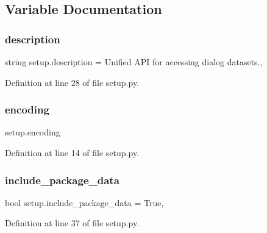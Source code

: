 \subsection{Variable Documentation}
\mbox{\label{namespacesetup_ade8aa54df2083113a10326ea2fe7934b}} 
\subsubsection{\texorpdfstring{description}{description}}
{\footnotesize\ttfamily string setup.\+description = \textquotesingle{}Unified A\+PI for accessing dialog datasets.\textquotesingle{},}



Definition at line 28 of file setup.\+py.

\mbox{\label{namespacesetup_a443be2d01fd539bf6761aff70724d876}} 
\subsubsection{\texorpdfstring{encoding}{encoding}}
{\footnotesize\ttfamily setup.\+encoding}



Definition at line 14 of file setup.\+py.

\mbox{\label{namespacesetup_afff286a1213d1545c5bf406189bb2679}} 
\subsubsection{\texorpdfstring{include\+\_\+package\+\_\+data}{include\_package\_data}}
{\footnotesize\ttfamily bool setup.\+include\+\_\+package\+\_\+data = True,}



Definition at line 37 of file setup.\+py.

\mbox{\label{namespacesetup_abead4f26b530856f858f0d44c7cf2588}} 
